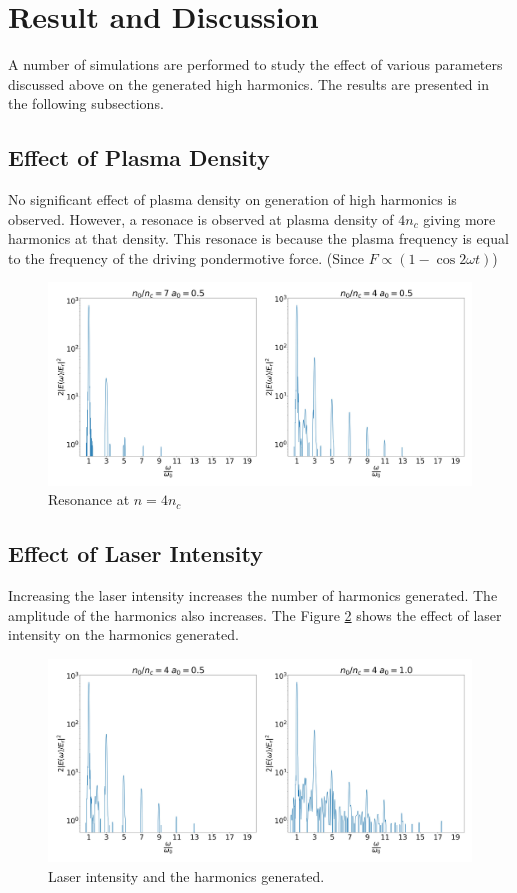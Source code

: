 \documentclass[12pt]{article}
\newenvironment{changemargin}[2]{
\begin{list}{}{
\setlength{\topsep}{0pt}
\setlength{\leftmargin}{#1}
\setlength{\rightmargin}{#2}
\setlength{\listparindent}{\parindent}
\setlength{\itemindent}{\parindent}
\setlength{\parsep}{\parskip}
}
\item[]}{\end{list}}
\begin{document}
\begin{changemargin}{-2cm}{-2cm}
    \section{Result and Discussion}
    A number of simulations are performed to study the effect of various parameters discussed above on the generated high harmonics. The results are presented in the following subsections.
    \subsection{Effect of Plasma Density}
    No significant effect of plasma density on generation of high harmonics is observed. However, a resonace is observed at plasma density of $4n_c$ giving more harmonics at that density. This resonace is because the plasma frequency is equal to the frequency of the driving pondermotive force. (Since $F\propto (1-\cos{2\omega t})$)
    \begin{figure}[h]
        \centering
        \includegraphics[width=1.0\textwidth]{images/density.jpg}
        \caption{Resonance at $n = 4n_c$}
        \label{fig:density}
    \end{figure}
    \subsection{Effect of Laser Intensity}
    Increasing the laser intensity increases the number of harmonics generated. The amplitude of the harmonics also increases. The Figure \ref{fig:intensity} shows the effect of laser intensity on the harmonics generated.

    \begin{figure}[h]
        \centering
        \includegraphics[width=1.0\textwidth, height=0.4\textwidth]{images/intensity.jpg}
        \caption{Laser intensity and the harmonics generated.}
        \label{fig:intensity}
    \end{figure}

\end{changemargin}
\end{document}
